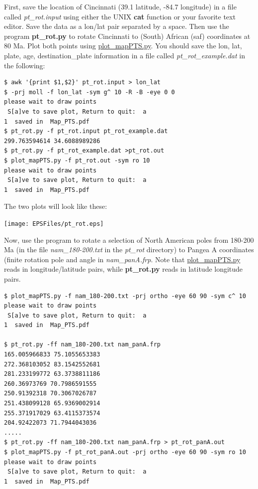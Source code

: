 \documentclass[11pt]{book}
\begin{document}
{{{{First, save  the location of Cincinnati (39.1 latitude, -84.7 longitude) in a file called {\it pt\_rot.input} using either the UNIX {\bf cat} function or your favorite text editor.  Save the data as a lon/lat pair separated by a space.  Then use the program {\bf pt\_rot.py} to rotate Cincinnati to (South) African (saf) coordinates at 80 Ma.  Plot both points using \href{#plot_mapPTS.py}{plot\_mapPTS.py}.   You should save the lon, lat, plate, age, destination\_plate information in a file called {\it pt\_rot\_example.dat} in the following:

\begin{verbatim}
$ awk '{print $1,$2}' pt_rot.input > lon_lat
$ -prj moll -f lon_lat -sym g^ 10 -R -B -eye 0 0
please wait to draw points
 S[a]ve to save plot, Return to quit:  a
1  saved in  Map_PTS.pdf
$ pt_rot.py -f pt_rot.input pt_rot_example.dat
299.763594614 34.6088989286
$ pt_rot.py -f pt_rot_example.dat >pt_rot.out
$ plot_mapPTS.py -f pt_rot.out -sym ro 10
please wait to draw points
 S[a]ve to save plot, Return to quit:  a
1  saved in  Map_PTS.pdf
\end{verbatim}

The two plots will look like these:

\texttt{[image: EPSFiles/pt\_rot.eps]}




Now, use the program to rotate a selection of North American poles from 180-200 Ma (in the file {\it nam\_180-200.txt} in the {\it pt\_rot} directory) to Pangea A coordinates (finite rotation pole and angle in {\it nam\_panA.frp}.   Note that \href{#plot_mapPTS.py}{plot\_mapPTS.py} reads in longitude/latitude pairs, while {\bf pt\_rot.py} reads in latitude longitude pairs.

\begin{verbatim}
$ plot_mapPTS.py -f nam_180-200.txt -prj ortho -eye 60 90 -sym c^ 10
please wait to draw points
 S[a]ve to save plot, Return to quit:  a
1  saved in  Map_PTS.pdf

$ pt_rot.py -ff nam_180-200.txt nam_panA.frp
165.005966833 75.1055653383
272.368103052 83.1542552681
281.233199772 63.3738811186
260.36973769 70.7986591555
250.91392318 70.3067026787
251.438099128 65.9369002914
255.371917029 63.4115373574
204.92422073 71.7944043036
.....
$ pt_rot.py -ff nam_180-200.txt nam_panA.frp > pt_rot_panA.out
$ plot_mapPTS.py -f pt_rot_panA.out -prj ortho -eye 60 90 -sym ro 10
please wait to draw points
 S[a]ve to save plot, Return to quit:  a
1  saved in  Map_PTS.pdf
\end{verbatim}

}}}}
\end{document}
